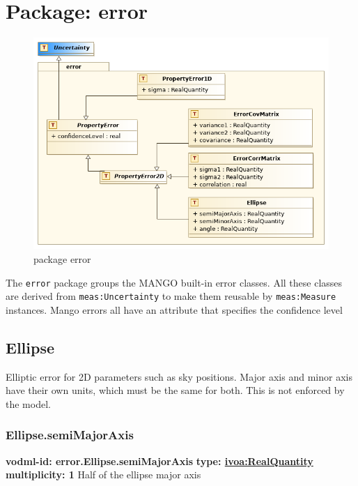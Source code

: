 \section{Package: error }
  \begin{figure}[h]
    \includegraphics[width=1.0\textwidth]{../model/error.png}
    \caption{package error}
    \label{fig:error}
  \end{figure}




  The \texttt{error} package groups the MANGO built-in error classes. All these classes are derived from \texttt{meas:Uncertainty} to make them reusable by \texttt{meas:Measure} instances. Mango errors all have an attribute that specifies the confidence level

  \subsection{Ellipse}
  \label{sect:error.Ellipse}
    Elliptic error for 2D parameters such as sky positions. Major axis and minor axis have their own units, which must be the same for both. This is not enforced by the model.

    \subsubsection{Ellipse.semiMajorAxis}
      \textbf{vodml-id: error.Ellipse.semiMajorAxis} \newline
      \textbf{type: \hyperref[sect:ivoa]{ivoa:RealQuantity}} \newline
      \textbf{multiplicity: 1} \newline 
      Half of the ellipse major axis

